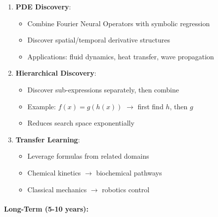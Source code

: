 \documentclass[twoside,11pt]{article}
\begin{document}
\begin{enumerate}
\item \textbf{PDE Discovery}:
   \begin{itemize}
   \item Combine Fourier Neural Operators with symbolic regression
   \item Discover spatial/temporal derivative structures
   \item Applications: fluid dynamics, heat transfer, wave propagation
   \end{itemize}

\item \textbf{Hierarchical Discovery}:
   \begin{itemize}
   \item Discover sub-expressions separately, then combine
   \item Example: $f(x) = g(h(x))$ $\to$ first find $h$, then $g$
   \item Reduces search space exponentially
   \end{itemize}

\item \textbf{Transfer Learning}:
   \begin{itemize}
   \item Leverage formulas from related domains
   \item Chemical kinetics $\to$ biochemical pathways
   \item Classical mechanics $\to$ robotics control
   \end{itemize}
\end{enumerate}

\paragraph{Long-Term (5-10 years):}
\end{document}
